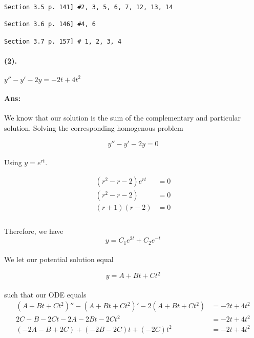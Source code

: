 \documentclass{article}
\begin{document}
\begin{verbatim}
Section 3.5 p. 141] #2, 3, 5, 6, 7, 12, 13, 14

Section 3.6 p. 146] #4, 6

Section 3.7 p. 157] # 1, 2, 3, 4
\end{verbatim}
\paragraph{(2).} $y'' - y' - 2y = -2t + 4t^2$
\paragraph{Ans: } We know that our solution is the sum of the complementary and particular solution.
Solving the corresponding homogenous problem

\[
  y'' - y' -2y = 0 
\]

\paragraph{} Using $y = e^{rt}$.

\begin{align*}
    (r^2 - r - 2)e^{rt} &= 0\\
          (r^2 - r - 2) &= 0\\
          (r+1)(r-2) &= 0 \\
\end{align*}
\paragraph{} Therefore, we have
\[
    y = C_1 e^{2t} + C_2 e^{-t}  
\]

\paragraph{}We let our potential solution equal

\[
  y = A + Bt + Ct^2
\]
\paragraph{}such that our ODE equals
\begin{align*}
    (A+Bt+Ct^2)'' - (A+Bt+Ct^2)' - 2(A+Bt+Ct^2) &= -2t + 4t^2\\
    2C - B - 2Ct - 2A - 2Bt - 2Ct^2               &= -2t + 4t^2\\
    (-2A-B+2C) + (-2B-2C)t + (-2C)t^2 &= -2t + 4t^2
\end{align*}
\end{document}
